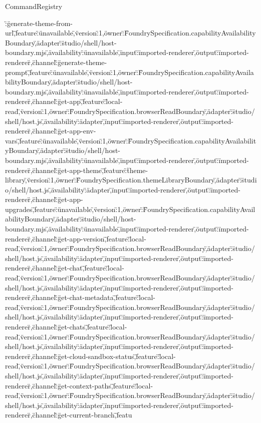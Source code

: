 \begin{lexlean}{CommandRegistry}
\begin{semanticmodule}
{\":\"generate-theme-from-url\",\"feature\":\"unavailable\",\"version\":1,\"owner\":\"FoundrySpecification.capabilityAvailabilityBoundary\",\"adapter\":\"studio/shell/host-boundary.mjs\",\"availability\":\"unavailable\",\"input\":\"imported-renderer\",\"output\":\"imported-renderer\"},{\"channel\":\"generate-theme-prompt\",\"feature\":\"unavailable\",\"version\":1,\"owner\":\"FoundrySpecification.capabilityAvailabilityBoundary\",\"adapter\":\"studio/shell/host-boundary.mjs\",\"availability\":\"unavailable\",\"input\":\"imported-renderer\",\"output\":\"imported-renderer\"},{\"channel\":\"get-app\",\"feature\":\"local-read\",\"version\":1,\"owner\":\"FoundrySpecification.browserReadBoundary\",\"adapter\":\"studio/shell/host.js\",\"availability\":\"adapter\",\"input\":\"imported-renderer\",\"output\":\"imported-renderer\"},{\"channel\":\"get-app-env-vars\",\"feature\":\"unavailable\",\"version\":1,\"owner\":\"FoundrySpecification.capabilityAvailabilityBoundary\",\"adapter\":\"studio/shell/host-boundary.mjs\",\"availability\":\"unavailable\",\"input\":\"imported-renderer\",\"output\":\"imported-renderer\"},{\"channel\":\"get-app-theme\",\"feature\":\"theme-library\",\"version\":1,\"owner\":\"FoundrySpecification.themeLibraryBoundary\",\"adapter\":\"studio/shell/host.js\",\"availability\":\"adapter\",\"input\":\"imported-renderer\",\"output\":\"imported-renderer\"},{\"channel\":\"get-app-upgrades\",\"feature\":\"unavailable\",\"version\":1,\"owner\":\"FoundrySpecification.capabilityAvailabilityBoundary\",\"adapter\":\"studio/shell/host-boundary.mjs\",\"availability\":\"unavailable\",\"input\":\"imported-renderer\",\"output\":\"imported-renderer\"},{\"channel\":\"get-app-version\",\"feature\":\"local-read\",\"version\":1,\"owner\":\"FoundrySpecification.browserReadBoundary\",\"adapter\":\"studio/shell/host.js\",\"availability\":\"adapter\",\"input\":\"imported-renderer\",\"output\":\"imported-renderer\"},{\"channel\":\"get-chat\",\"feature\":\"local-read\",\"version\":1,\"owner\":\"FoundrySpecification.browserReadBoundary\",\"adapter\":\"studio/shell/host.js\",\"availability\":\"adapter\",\"input\":\"imported-renderer\",\"output\":\"imported-renderer\"},{\"channel\":\"get-chat-metadata\",\"feature\":\"local-read\",\"version\":1,\"owner\":\"FoundrySpecification.browserReadBoundary\",\"adapter\":\"studio/shell/host.js\",\"availability\":\"adapter\",\"input\":\"imported-renderer\",\"output\":\"imported-renderer\"},{\"channel\":\"get-chats\",\"feature\":\"local-read\",\"version\":1,\"owner\":\"FoundrySpecification.browserReadBoundary\",\"adapter\":\"studio/shell/host.js\",\"availability\":\"adapter\",\"input\":\"imported-renderer\",\"output\":\"imported-renderer\"},{\"channel\":\"get-cloud-sandbox-status\",\"feature\":\"local-read\",\"version\":1,\"owner\":\"FoundrySpecification.browserReadBoundary\",\"adapter\":\"studio/shell/host.js\",\"availability\":\"adapter\",\"input\":\"imported-renderer\",\"output\":\"imported-renderer\"},{\"channel\":\"get-context-paths\",\"feature\":\"local-read\",\"version\":1,\"owner\":\"FoundrySpecification.browserReadBoundary\",\"adapter\":\"studio/shell/host.js\",\"availability\":\"adapter\",\"input\":\"imported-renderer\",\"output\":\"imported-renderer\"},{\"channel\":\"get-current-branch\",\"featu}
\end{semanticmodule}
\end{lexlean}

